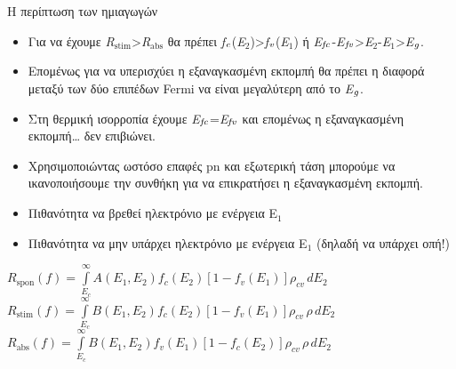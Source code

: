 \documentclass[11pt,aspectratio=169]{beamer}
\begin{document}
\begin{frame}[shrink=20,t]{Η περίπτωση των ημιαγωγών}
\begin{itemize}
\item Για να έχουμε \textit{R}$_{\text{stim}}$>\textit{R}$_{\text{abs}}$ θα πρέπει \textit{f}$_{\text{\textit{c}}}$(\textit{E}$_{\text{2}}$)>\textit{f}$_{\text{\textit{v}}}$(\textit{E}$_{\text{1}}$) ή \textit{Ε}$_{\text{\textit{fc}}}$-\textit{E}$_{\text{\textit{fv}}}$>\textit{E}$_{\text{2}}$-\textit{E}$_{\text{1}}$>\textit{E}$_{\text{\textit{g}}}$.
\item Επομένως για να υπερισχύει η εξαναγκασμένη εκπομπή θα πρέπει η διαφορά μεταξύ των δύο επιπέδων Fermi να είναι μεγαλύτερη από το \textit{E}$_{\text{\textit{g}}}$.
\item Στη θερμική ισορροπία έχουμε \textit{E}$_{\text{\textit{fc}}}$=\textit{E}$_{\text{\textit{fv}}}$ και επομένως η εξαναγκασμένη εκπομπή… δεν επιβιώνει.
\item Χρησιμοποιώντας ωστόσο επαφές pn και εξωτερική τάση μπορούμε να ικανοποιήσουμε την συνθήκη για να επικρατήσει η εξαναγκασμένη εκπομπή.
\end{itemize}
\medskip
\begin{itemize}
\item Πιθανότητα να βρεθεί ηλεκτρόνιο με ενέργεια Ε$_{\text{1}}$
\end{itemize}
\medskip
\begin{itemize}
\item Πιθανότητα να μην υπάρχει ηλεκτρόνιο με ενέργεια Ε$_{\text{1}}$ (δηλαδή να υπάρχει οπή!)
\end{itemize}
\begin{center}
$\displaystyle R_{\mathrm{spon}}(f)=\int\limits_{E_{c}}^{\infty}A(E_{1},E_{2})f_{c}(E_{2})\left[1-f_{v}(E_{1})\right]\rho_{cv}\,dE_{2}$\\[0.6ex]
$\displaystyle R_{\mathrm{stim}}(f)=\int\limits_{E_{c}}^{\infty}B(E_{1},E_{2})f_{c}(E_{2})\left[1-f_{v}(E_{1})\right]\rho_{cv}\,\rho\,dE_{2}$\\[0.6ex]
$\displaystyle R_{\mathrm{abs}}(f)=\int\limits_{E_{c}}^{\infty}B(E_{1},E_{2})f_{v}(E_{1})\left[1-f_{c}(E_{2})\right]\rho_{cv}\,\rho\,dE_{2}$\\[0.6ex]
\end{center}
\end{frame}
\end{document}
